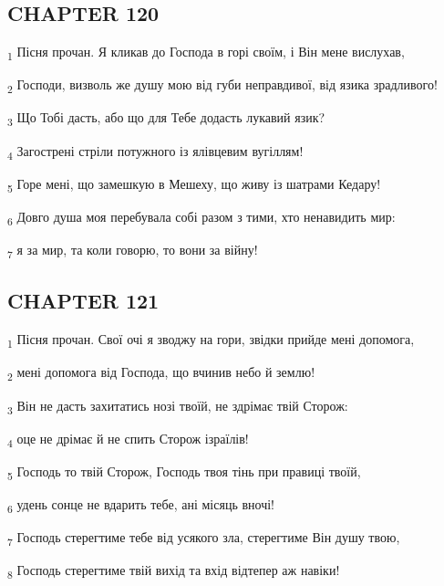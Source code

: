 \subsection{CHAPTER 120}
\begin{tcolorbox}
\textsubscript{1} Пісня прочан. Я кликав до Господа в горі своїм, і Він мене вислухав,
\end{tcolorbox}
\begin{tcolorbox}
\textsubscript{2} Господи, визволь же душу мою від губи неправдивої, від язика зрадливого!
\end{tcolorbox}
\begin{tcolorbox}
\textsubscript{3} Що Тобі дасть, або що для Тебе додасть лукавий язик?
\end{tcolorbox}
\begin{tcolorbox}
\textsubscript{4} Загострені стріли потужного із ялівцевим вугіллям!
\end{tcolorbox}
\begin{tcolorbox}
\textsubscript{5} Горе мені, що замешкую в Мешеху, що живу із шатрами Кедару!
\end{tcolorbox}
\begin{tcolorbox}
\textsubscript{6} Довго душа моя перебувала собі разом з тими, хто ненавидить мир:
\end{tcolorbox}
\begin{tcolorbox}
\textsubscript{7} я за мир, та коли говорю, то вони за війну!
\end{tcolorbox}
\subsection{CHAPTER 121}
\begin{tcolorbox}
\textsubscript{1} Пісня прочан. Свої очі я зводжу на гори, звідки прийде мені допомога,
\end{tcolorbox}
\begin{tcolorbox}
\textsubscript{2} мені допомога від Господа, що вчинив небо й землю!
\end{tcolorbox}
\begin{tcolorbox}
\textsubscript{3} Він не дасть захитатись нозі твоїй, не здрімає твій Сторож:
\end{tcolorbox}
\begin{tcolorbox}
\textsubscript{4} оце не дрімає й не спить Сторож ізраїлів!
\end{tcolorbox}
\begin{tcolorbox}
\textsubscript{5} Господь то твій Сторож, Господь твоя тінь при правиці твоїй,
\end{tcolorbox}
\begin{tcolorbox}
\textsubscript{6} удень сонце не вдарить тебе, ані місяць вночі!
\end{tcolorbox}
\begin{tcolorbox}
\textsubscript{7} Господь стерегтиме тебе від усякого зла, стерегтиме Він душу твою,
\end{tcolorbox}
\begin{tcolorbox}
\textsubscript{8} Господь стерегтиме твій вихід та вхід відтепер аж навіки!
\end{tcolorbox}
